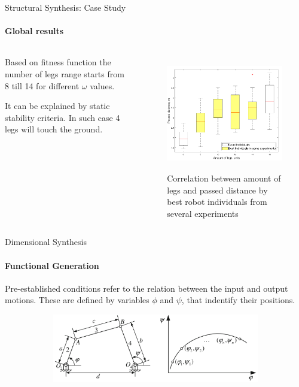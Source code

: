\documentclass[aspectratio=169]{beamer}
\begin{document}
\begin{frame}[t]{Structural Synthesis: Case Study}
    \framesubtitle{Global results}
    \begin{columns}[T,onlytextwidth]
        \begin{column}{0.49\textwidth}
            Based on fitness function the number of legs range starts from 8 till 14 for different $\omega$ values. 
            
            It can be explained by static stability criteria. In such case 4 legs will touch the ground.    
        \end{column}
        \begin{column}{0.49\textwidth}
            \vspace{-1.5cm}
            \begin{figure}[H]
                \centering\includegraphics[height=5cm,width=1\textwidth,keepaspectratio]{box_plot_structural_synthesis.png}
                \caption*{Correlation between amount of legs and passed distance by best robot individuals from several experiments}
                \label{fig:box_plot_structural_synthesis.png}
            \end{figure}
        \end{column}
    \end{columns}
\end{frame}


\begin{frame}[t]{Dimensional Synthesis}
\framesubtitle{Functional Generation}
Pre-established conditions refer to the relation between the input and output motions. These are defined by variables $\phi$ and $\psi$, that indentify their positions.
    \begin{figure}[H]
        \centering\includegraphics[height=3cm,width=1\textwidth,keepaspectratio]{func_gen1.png}
        \label{fig:func_gen1.png}
    \end{figure}
\end{frame}
\end{document}
